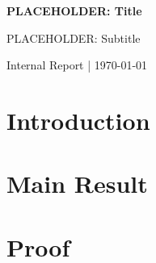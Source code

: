 \documentclass[12pt]{article}
\newtheorem{theorem}{Theorem}
\begin{document}
\begin{center}
{\Large \textbf{PLACEHOLDER: Title}}

{\large PLACEHOLDER: Subtitle}

\medskip

Internal Report \hspace{1em}|\hspace{1em} \today
\end{center}


\section{Introduction}\label{sec:intro}






\section{Main Result}\label{sec:result}




\section{Proof}\label{sec:proof}

\end{document}
